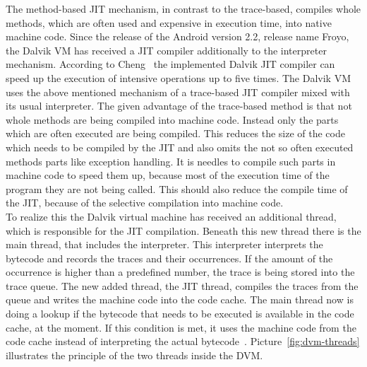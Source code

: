 The method-based JIT mechanism, in contrast to the trace-based, compiles whole methods, which are often used and expensive in execution time, into native machine code.
Since the release of the Android version 2.2, release name Froyo, the Dalvik VM has received a JIT compiler additionally to the interpreter mechanism.
According to Cheng~\cite{cheng2010jit} the implemented Dalvik JIT compiler can speed up the execution of intensive operations up to five times.
The Dalvik VM uses the above mentioned mechanism of a trace-based JIT compiler mixed with its usual interpreter.
The given advantage of the trace-based method is that not whole methods are being compiled into machine code.
Instead only the parts which are often executed are being compiled.
This reduces the size of the code which needs to be compiled by the JIT and also omits the not so often executed methods parts like exception handling.
It is needles to compile such parts in machine code to speed them up, because most of the execution time of the program they are not being called.
This should also reduce the compile time of the JIT, because of the selective compilation into machine code.\\
To realize this the Dalvik virtual machine has received an additional thread, which is responsible for the JIT compilation.
Beneath this new thread there is the main thread, that includes the interpreter.
This interpreter interprets the bytecode and records the traces and their occurrences.
If the amount of the occurrence is higher than a predefined number, the trace is being stored into the trace queue.
The new added thread, the JIT thread, compiles the traces from the queue and writes the machine code into the code cache.
The main thread now is doing a lookup if the bytecode that needs to be executed is available in the code cache, at the moment.
If this condition is met, it uses the machine code from the code cache instead of interpreting the actual bytecode~\cite{oh2012evaluation}.
Picture~\ref{fig:dvm-threads} illustrates the principle of the two threads inside the DVM.\\
